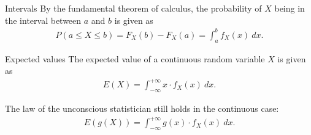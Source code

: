 \documentclass{beamer}
\def\padding{\vspace{0.5cm}}
\begin{document}
\begin{frame}
    \begin{block}{Intervals}
        By the fundamental theorem of calculus, the probability of $X$ being in the interval between $a$ and $b$ is given as
        \begin{align*}
            P(a \leq X \leq b) = F_X(b) - F_X(a) = \int_a^b f_X(x)\ dx.
        \end{align*}
    \end{block}
\end{frame}

\begin{frame}
    \begin{block}{Expected values}
        The expected value of a continuous random variable $X$ is given as
        \begin{align*}
            E(X) = \int_{- \infty}^{+ \infty} x \cdot f_X(x)\ dx.
        \end{align*}\pause\par\padding
        The law of the unconscious statistician still holds in the continuous case:
        \begin{align*}
            E(g(X)) = \int_{- \infty}^{+ \infty} g(x) \cdot f_X(x)\ dx.
        \end{align*}
    \end{block}
\end{frame}
\end{document}
